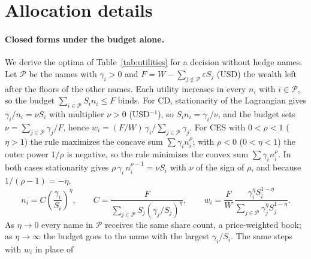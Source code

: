 
\section{Allocation details}\label{app:allocation}

\paragraph{Closed forms under the budget alone.}
We derive the optima of Table~\ref{tab:utilities} for a decision without hedge names. Let $\mathcal{P}$ be the names
with $\gamma_i > 0$ and $F = W - \sum_{j \notin \mathcal{P}} \varepsilon S_j$ (USD) the wealth left after the floors
of the other names. Each utility increases in every $n_i$ with $i \in \mathcal{P}$, so the budget
$\sum_{i \in \mathcal{P}} S_i n_i \le F$ binds. For CD, stationarity of the Lagrangian gives
$\gamma_i / n_i = \nu S_i$ with multiplier $\nu > 0$ (USD$^{-1}$), so $S_i n_i = \gamma_i / \nu$, and the budget sets
$\nu = \sum_{j \in \mathcal{P}} \gamma_j / F$, hence $w_i = (F/W)\, \gamma_i / \sum_{j \in \mathcal{P}} \gamma_j$.
For CES with $0 < \rho < 1$ ($\eta > 1$) the rule maximizes the concave sum $\sum \gamma_i n_i^{\rho}$; with
$\rho < 0$ ($0 < \eta < 1$) the outer power $1/\rho$ is negative, so the rule minimizes the convex sum
$\sum \gamma_i n_i^{\rho}$. In both cases stationarity gives $\rho\, \gamma_i\, n_i^{\rho - 1} = \nu S_i$ with $\nu$
of the sign of $\rho$, and because $1/(\rho - 1) = -\eta$,
\begin{equation}
n_i = C \left( \frac{\gamma_i}{S_i} \right)^{\eta}, \qquad
C = \frac{F}{\sum_{j \in \mathcal{P}} S_j (\gamma_j / S_j)^{\eta}}, \qquad
w_i = \frac{F}{W}\, \frac{\gamma_i^{\eta} S_i^{1-\eta}}{\sum_{j \in \mathcal{P}} \gamma_j^{\eta} S_j^{1-\eta}}.
\label{eq:S-ces-closed}
\end{equation}
As $\eta \to 0$ every name in $\mathcal{P}$ receives the same share count, a price-weighted book; as
$\eta \to \infty$ the budget goes to the name with the largest $\gamma_i / S_i$. The same steps with $w_i$ in place of

